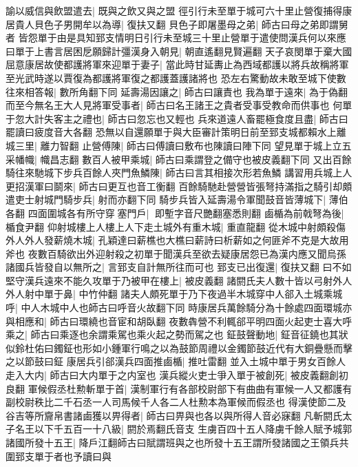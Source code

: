 諭以威信與飲盟遣去|{
	既與之飲又與之盟}
徑引行未至單于城可六十里止營復捕得康居貴人貝色子男開牟以為導|{
	復扶又翻}
貝色子即屠墨母之弟|{
	師古曰母之弟即謂舅者}
皆怨單于由是具知郅支情明日引行未至城三十里止營單于遣使問漢兵何以來應曰單于上書言居困戹願歸計彊漢身入朝見|{
	朝直遙翻見賢遍翻}
天子哀閔單于棄大國屈意康居故使都護將軍來迎單于妻子|{
	當此時甘延夀止為西域都護以將兵故稱將軍至光武時遂以賈復為都護將軍復之都護蓋護諸將也}
恐左右驚動故未敢至城下使數往來相答報|{
	數所角翻下同}
延壽湯因讓之|{
	師古曰讓責也}
我為單于遠來|{
	為于偽翻}
而至今無名王大人見將軍受事者|{
	師古曰名王諸王之貴者受事受教命而供事也}
何單于忽大計失客主之禮也|{
	師古曰忽忘也又輕也}
兵來道遠人畜罷極食度且盡|{
	師古曰罷讀曰疲度音大各翻}
恐無以自還願單于與大臣審計策明日前至郅支城都賴水上離城三里|{
	離力智翻}
止營傅陳|{
	師古曰傅讀曰敷布也陳讀曰陣下同}
望見單于城上立五采幡幟|{
	幟昌志翻}
數百人被甲乘城|{
	師古曰乘謂登之備守也被皮義翻下同}
又出百餘騎往來馳城下步兵百餘人夾門魚鱗陳|{
	師古曰言其相接次形若魚鱗}
講習用兵城上人更招漢軍曰鬬來|{
	師古曰更互也音工衡翻}
百餘騎馳赴營營皆張弩持滿指之騎引却頗遣吏士射城門騎步兵|{
	射而亦翻下同}
騎步兵皆入延壽湯令軍聞鼓音皆薄城下|{
	薄伯各翻}
四面圍城各有所守穿塞門戶|{
	即塹字音尺艷翻塞悉則翻}
鹵楯為前戟弩為後|{
	楯食尹翻}
仰射城樓上人樓上人下走土城外有重木城|{
	重直龍翻}
從木城中射頗殺傷外人外人發薪燒木城|{
	孔穎達曰薪樵也大樵曰薪詩曰析薪如之何匪斧不克是大故用斧也}
夜數百騎欲出外迎射殺之初單于聞漢兵至欲去疑康居怨已為漢内應又聞烏孫諸國兵皆發自以無所之|{
	言郅支自計無所往而可也}
郅支已出復還|{
	復扶又翻}
曰不如堅守漢兵遠來不能久攻單于乃被甲在樓上|{
	被皮義翻}
諸閼氏夫人數十皆以弓射外人外人射中單于鼻|{
	中竹仲翻}
諸夫人頗死單于乃下夜過半木城穿中人郤入土城乘城呼|{
	中人木城中人也師古曰呼音火故翻下同}
時康居兵萬餘騎分為十餘處四面環城亦與相應和|{
	師古曰環繞也音宦和胡臥翻}
夜數犇營不利輒郤平明四面火起吏士喜大呼乘之|{
	師古曰乘逐也余謂乘駕也乘火起之勢而駕之也}
鉦鼓聲動地|{
	鉦音征鐃也其狀似鈴杜佑曰鐲鉦也形如小鍾軍行鳴之以為鼓節周禮以金鐲節鼓近代有大銅疊懸而擊之以節鼓曰鉦}
康居兵引郤漢兵四面推鹵楯|{
	推吐雷翻}
並入土城中單于男女百餘人走入大内|{
	師古曰大内單于之内室也}
漢兵縱火吏士爭入單于被創死|{
	被皮義翻創初良翻}
軍候假丞杜勲斬單于首|{
	漢制軍行有各部校尉部下有曲曲有軍候一人又都護有副校尉秩比二千石丞一人司馬候千人各二人杜勲本為軍候而假丞也}
得漢使節二及谷吉等所齎帛書諸鹵獲以畀得者|{
	師古曰畀與也各以與所得人音必寐翻}
凡斬閼氏太子名王以下千五百一十八級|{
	閼於焉翻氏音支}
生虜百四十五人降虜千餘人賦予城郭諸國所發十五王|{
	降戶江翻師古曰賦謂班與之也所發十五王謂所發諸國之王領兵共圍郅支單于者也予讀曰與}



